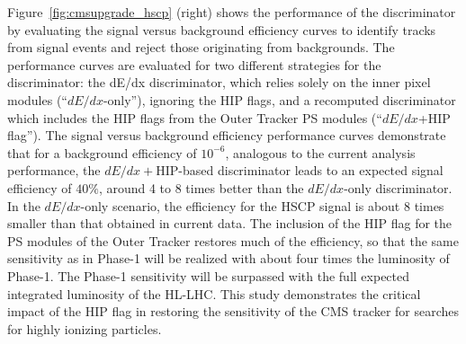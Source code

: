 Figure~\ref{fig:cmsupgrade_hscp} (right) shows the performance of the discriminator by evaluating the signal versus background
efficiency curves to identify tracks from signal events and reject those originating from backgrounds. The performance curves are evaluated for two different strategies for
the discriminator: the dE/dx discriminator, which relies solely on the inner pixel modules
(``$dE/dx$-only''), ignoring the HIP flags, and a recomputed discriminator which includes the
HIP flags from the Outer Tracker PS modules (“$dE/dx$+HIP flag”). The signal versus background
efficiency performance curves demonstrate that for a background efficiency
of $10^{-6}$, analogous to the current analysis performance, the $dE/dx+$HIP-based discriminator
leads to an expected signal efficiency of $40\%$, around 4 to 8 times better than the $dE/dx$-only
discriminator. In the $dE/dx$-only scenario, the efficiency for the HSCP signal is about 8 times
smaller than that obtained in current data. The inclusion of the HIP flag for the PS modules of the Outer Tracker restores much of the efficiency, so that the
same sensitivity as in Phase-1 will be realized with about four times the luminosity of Phase-1.
The Phase-1 sensitivity will be surpassed with the full expected integrated luminosity of the
HL-LHC. This study demonstrates the critical impact of the HIP flag in restoring the sensitivity
of the CMS tracker for searches for highly ionizing particles.

